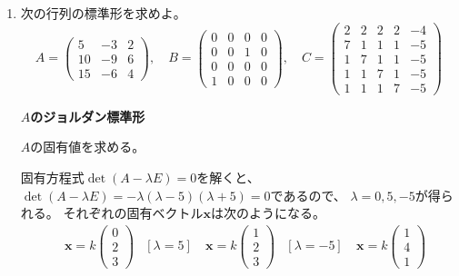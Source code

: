 \documentclass[12pt,b5paper]{ltjsarticle}
\begin{document}
\begin{enumerate}
 \item
      次の行列の標準形を求めよ。
            \begin{equation}
             A=
              \begin{pmatrix}
               5 & -3 & 2 \\ 10 & -9 & 6 \\ 15 & -6 & 4
              \end{pmatrix}
              , \quad
              B=
              \begin{pmatrix}
               0&0&0&0\\0&0&1&0\\0&0&0&0\\1&0&0&0
              \end{pmatrix}
              , \quad
              C=
              \begin{pmatrix}
              2 & 2 & 2 & 2 & -4\\
              7 & 1 & 1 & 1 & -5\\
              1 & 7 & 1 & 1 & -5\\
              1 & 1 & 7 & 1 & -5\\
              1 & 1 & 1 & 7 & -5
              \end{pmatrix}
            \end{equation}

\dotfill

      \textbf{$A$のジョルダン標準形}
      
      $A$の固有値を求める。

      固有方程式$\det(A-\lambda E) =0$を解くと、
      $\det(A-\lambda E) = -\lambda(\lambda-5)(\lambda+5)=0$であるので、
      $\lambda = 0,5,-5$が得られる。
      それぞれの固有ベクトル$\bm{x}$は次のようになる。
      \begin{align}
       [\lambda=0]\ &
       \bm{x}=k
       \begin{pmatrix}0\\2\\3\end{pmatrix} &
       [\lambda=5]\ &
       \bm{x}=k
       \begin{pmatrix}1\\2\\3\end{pmatrix} &
       [\lambda=-5]\ &
       \bm{x}=k
       \begin{pmatrix}1\\4\\1\end{pmatrix}
      \end{align}


\end{enumerate}
\end{document}

